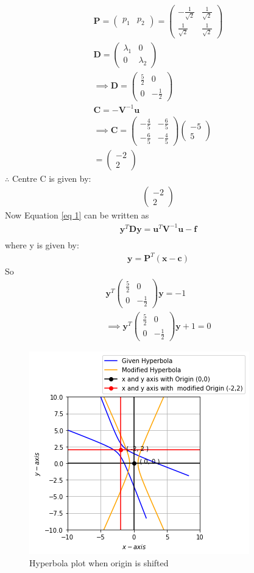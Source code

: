 \documentclass[journal,12pt,twocolumn]{IEEEtran}
\providecommand{\brak}[1]{\ensuremath{\left(#1\right)}}
\newcommand{\myvec}[1]{\ensuremath{\begin{pmatrix}#1\end{pmatrix}}}
\numberwithin{equation}{subsection}
\let\vec\mathbf
\begin{document}
\begin{align}
  \vec{P}=\myvec{p_1&p_2}= \myvec{-\frac{1}{\sqrt{2}}&\frac{1}{\sqrt{2}}\\\frac{1}{\sqrt{2}}& \frac{1}{\sqrt{2}}}\\
   \vec{D}=\myvec{\lambda_1&0\\0&\lambda_2}\\
   \implies 
   \vec{D}=\myvec{\frac{5}{2}&0\\0&-\frac{1}{2}} \label{eq 6}\\
    \vec{C}=-\vec{V}^{-1}\vec{u}\\
    \implies\vec{C} =\myvec{-\frac{4}{5}&-\frac{6}{5}\\-\frac{6}{5}&-\frac{4}{5}} \myvec{-5\\ 5}\\
   = \myvec{-2\\2}
\end{align}
$\therefore$ Centre C is given by: 
\begin{align}
  \myvec{-2\\2}\label{eq 6}
 \end{align}
 Now Equation \eqref{eq 1} can be written as
\begin{align}
    \vec{y}^T\vec{D}\vec{y}=\vec{u}^T \vec {V}^{-1}\vec {u}-\vec {f}\\
\end{align}
where y is given by:
\begin{align}
     \vec{y}= \vec{P}^T\brak{\vec{x}-\vec{c}}
\end{align}
So 
\begin{align}
   \vec{y}^T\myvec{\frac{5}{2}&0\\0&-\frac{1}{2}}\vec{y}=-1\\
   \implies \vec{y}^T\myvec{\frac{5}{2}&0\\0&-\frac{1}{2}}\vec{y}+1=0
\end{align}
\begin{figure}[h!]
	\centering
	\includegraphics[width=\columnwidth]{hyberbola.png}
	\caption{Hyperbola plot when origin is shifted}
	\label{myfig}
\end{figure}
\end{document}
